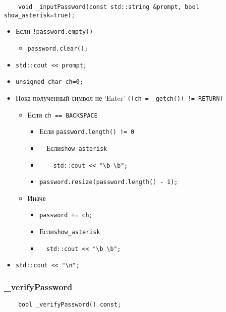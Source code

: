 \begin{lstlisting}
    void _inputPassword(const std::string &prompt, bool show_asterisk=true);
\end{lstlisting}

\begin{itemize}
    \item Если \verb|!password.empty()|
        \begin{itemize}
            \item \verb|password.clear();|
        \end{itemize}
    \item \verb|std::cout << prompt;|
    \item \verb|unsigned char ch=0;|
    \item Пока полученный символ не 'Enter' \verb|((ch = _getch()) != RETURN)|
        \begin{itemize}
            \item Если \verb|ch == BACKSPACE|
            \begin{itemize}
                \item Если \verb|password.length() != 0|
                \item \ \ Если\verb|show_asterisk|
                \item \ \ \ \ \verb|std::cout << "\b \b";|
                \item \verb|password.resize(password.length() - 1);|
            \end{itemize}
            \item Иначе
            \begin{itemize}
                \item \verb|password += ch;|
                \item Если\verb|show_asterisk|
                \item \ \ \verb|std::cout << "\b \b";|
            \end{itemize}
        \end{itemize}
    \item \verb|std::cout << "\n";|
\end{itemize}

\subsubsection{\_verifyPassword}

\begin{lstlisting}
    bool _verifyPassword() const;
\end{lstlisting}


